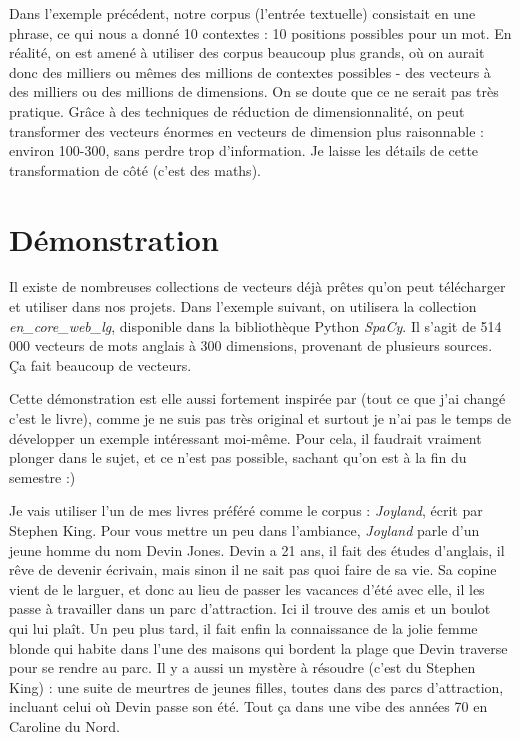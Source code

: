 \documentclass[11pt, a4paper]{report}
\begin{document}
Dans l'exemple précédent, notre corpus (l'entrée textuelle) consistait en une phrase, ce qui 
nous a donné 10 contextes : 10 positions possibles pour un mot.  
En réalité, on est amené à utiliser des corpus beaucoup plus grands, où on aurait donc des 
milliers ou mêmes des millions de contextes possibles - des vecteurs à des milliers ou des 
millions de dimensions. On se doute que ce ne serait pas très 
pratique. Grâce à des techniques de réduction de dimensionnalité, on peut transformer des vecteurs 
énormes en vecteurs de dimension plus raisonnable : environ 100-300, sans perdre trop 
d'information. Je laisse les détails de cette 
transformation de côté (c'est des maths).

\section{Démonstration}
Il existe de nombreuses collections de vecteurs déjà prêtes qu'on 
peut télécharger et utiliser dans nos projets. Dans l'exemple suivant, 
on utilisera la collection \textit{en\_core\_web\_lg}, disponible dans la bibliothèque Python 
\textit{SpaCy}. Il s'agit de 514 000 vecteurs de mots 
anglais à 300 dimensions, provenant de plusieurs sources. 
Ça fait beaucoup de vecteurs. 

Cette démonstration est elle aussi fortement inspirée par
\cite[\textit{Understanding word vectors}, Allison PARISH]{understanding-word-vectors} (tout ce que j'ai changé c'est le livre),
comme je ne suis pas très original et surtout je n'ai pas le temps de développer un exemple intéressant 
moi-même. Pour cela, il faudrait vraiment plonger dans le sujet, et ce n'est pas 
possible, sachant qu'on est à la fin du semestre :)

Je vais utiliser l'un de mes livres préféré comme le corpus : 
\textit{Joyland}, écrit par Stephen King. Pour vous mettre un peu dans l'ambiance, 
\textit{Joyland} parle d'un jeune homme du nom Devin Jones. Devin a 21 ans, il fait 
des études d'anglais, il rêve de devenir écrivain, mais sinon il ne sait pas 
quoi faire de sa vie. Sa copine vient de le larguer, et donc au lieu de 
passer les vacances d'été avec elle, il les passe à travailler dans un parc 
d'attraction. Ici il trouve des amis et un boulot qui lui plaît. Un peu plus tard, 
il fait enfin la connaissance de la jolie femme blonde qui habite dans l'une des maisons 
qui bordent la plage que Devin traverse pour se rendre au parc. Il y a aussi 
un mystère à résoudre (c'est du Stephen King) : une suite de meurtres de jeunes 
filles, toutes dans des parcs d'attraction, incluant celui où Devin passe son été. 
Tout ça dans une vibe des années 70 en Caroline du Nord. 
\end{document}
